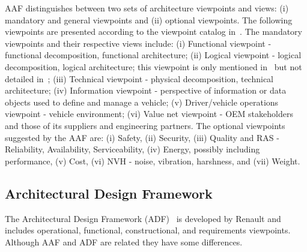  AAF distinguishes between two sets of architecture viewpoints and views: (i) mandatory and general viewpoints and (ii) optional viewpoints. The following viewpoints are presented according to the viewpoint catalog in~\cite{Rozanski2005}.
The mandatory viewpoints and their respective views include: (i)
%
Functional viewpoint - functional decomposition, functional
architecture;
(ii) Logical viewpoint - logical decomposition, logical architecture; this viewpoint is only mentioned in~\cite{Broy} but not detailed in~\cite{TUM-I0915};
(iii) Technical viewpoint - physical decomposition, technical architecture;
(iv) Information viewpoint - perspective of information or data objects used to
define and manage a vehicle;
(v) Driver/vehicle operations viewpoint - vehicle environment;
(vi) Value net viewpoint - OEM stakeholders and those of its suppliers and engineering partners. 
The optional viewpoints suggested by the AAF are:
(i) Safety, (ii) Security, (iii) Quality and RAS - Reliability, Availability, Serviceability, (iv) Energy, possibly including performance, (v) Cost, (vi) NVH - noise, vibration, harshness, and (vii) Weight.

\subsection{Architectural Design Framework}

The Architectural Design Framework (ADF)~\cite{AFRenault} is developed by Renault %
and 
includes operational, functional, constructional, and requirements viewpoints. Although
 AAF and ADF are related they have some differences. 

